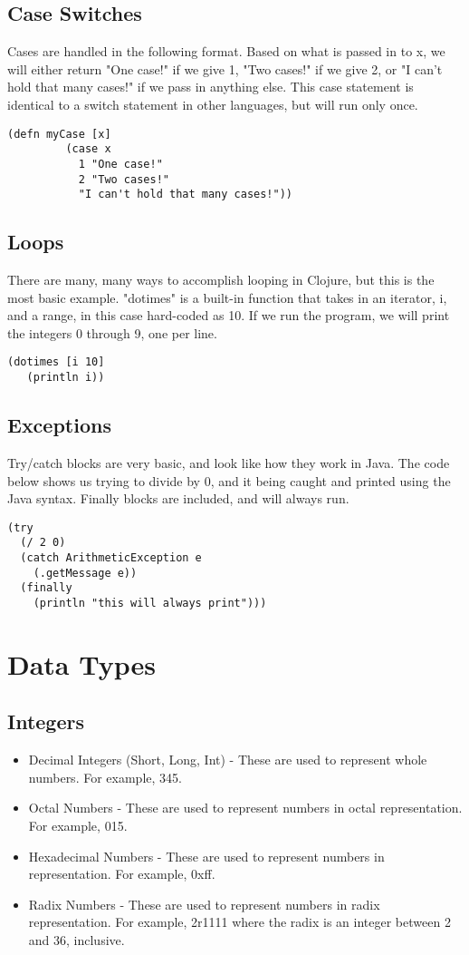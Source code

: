 \documentclass{article}
\begin{document}
\subsection{Case Switches}
Cases are handled in the following format. Based on what is passed in to x, we will either return "One case!" if we give 1, "Two cases!" if we give 2, or "I can't hold that many cases!" if we pass in anything else. This case statement is identical to a switch statement in other languages, but will run only once.
\begin{lstlisting}
(defn myCase [x]
         (case x
           1 "One case!"
           2 "Two cases!"
           "I can't hold that many cases!"))
\end{lstlisting}

\subsection{Loops}
There are many, many ways to accomplish looping in Clojure, but this is the most basic example. "dotimes" is a built-in function that takes in an iterator, i, and a range, in this case hard-coded as 10. If we run the program, we will print the integers 0 through 9, one per line.
\begin{lstlisting}
(dotimes [i 10]
   (println i))
\end{lstlisting}

\subsection{Exceptions}
Try/catch blocks are very basic, and look like how they work in Java. The code below shows us trying to divide by 0, and it being caught and printed using the Java syntax. Finally blocks are included, and will always run.
\begin{lstlisting}
(try
  (/ 2 0)
  (catch ArithmeticException e
    (.getMessage e))
  (finally
    (println "this will always print")))
\end{lstlisting}


\section{Data Types}
\subsection{Integers}
\begin{itemize}
\item Decimal Integers (Short, Long, Int) - These are used to represent whole numbers. For example, 345.
\item Octal Numbers - These are used to represent numbers in octal representation. For example, 015.
\item Hexadecimal Numbers - These are used to represent numbers in representation. For example, 0xff.
\item Radix Numbers - These are used to represent numbers in radix representation. For example, 2r1111 where the radix is an integer between 2 and 36, inclusive.
\end{itemize}
\end{document}
